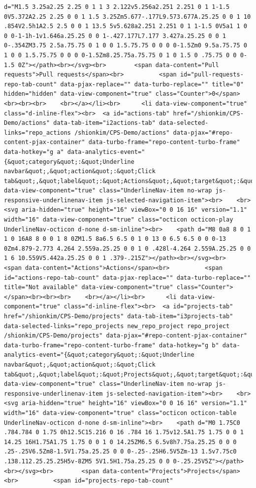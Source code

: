 \documentclass[
  letterpaper,
]{book}
\begin{document}
\begin{verbatim}
d="M1.5 3.25a2.25 2.25 0 1 1 3 2.122v5.256a2.251 2.251 0 1 1-1.5 0V5.372A2.25 2.25 0 0 1 1.5 3.25Zm5.677-.177L9.573.677A.25.25 0 0 1 10 .854V2.5h1A2.5 2.5 0 0 1 13.5 5v5.628a2.251 2.251 0 1 1-1.5 0V5a1 1 0 0 0-1-1h-1v1.646a.25.25 0 0 1-.427.177L7.177 3.427a.25.25 0 0 1 0-.354ZM3.75 2.5a.75.75 0 1 0 0 1.5.75.75 0 0 0 0-1.5Zm0 9.5a.75.75 0 1 0 0 1.5.75.75 0 0 0 0-1.5Zm8.25.75a.75.75 0 1 0 1.5 0 .75.75 0 0 0-1.5 0Z"></path><br></svg><br>        <span data-content="Pull requests">Pull requests</span><br>          <span id="pull-requests-repo-tab-count" data-pjax-replace="" data-turbo-replace="" title="0" hidden="hidden" data-view-component="true" class="Counter">0</span><br><br><br>    <br></a></li><br>      <li data-view-component="true" class="d-inline-flex"><br>  <a id="actions-tab" href="/shionkim/CPS-Demo/actions" data-tab-item="i2actions-tab" data-selected-links="repo_actions /shionkim/CPS-Demo/actions" data-pjax="#repo-content-pjax-container" data-turbo-frame="repo-content-turbo-frame" data-hotkey="g a" data-analytics-event="{&quot;category&quot;:&quot;Underline navbar&quot;,&quot;action&quot;:&quot;Click tab&quot;,&quot;label&quot;:&quot;Actions&quot;,&quot;target&quot;:&quot;UNDERLINE_NAV.TAB&quot;}" data-view-component="true" class="UnderlineNav-item no-wrap js-responsive-underlinenav-item js-selected-navigation-item"><br>    <br>              <svg aria-hidden="true" height="16" viewBox="0 0 16 16" version="1.1" width="16" data-view-component="true" class="octicon octicon-play UnderlineNav-octicon d-none d-sm-inline"><br>    <path d="M8 0a8 8 0 1 1 0 16A8 8 0 0 1 8 0ZM1.5 8a6.5 6.5 0 1 0 13 0 6.5 6.5 0 0 0-13 0Zm4.879-2.773 4.264 2.559a.25.25 0 0 1 0 .428l-4.264 2.559A.25.25 0 0 1 6 10.559V5.442a.25.25 0 0 1 .379-.215Z"></path><br></svg><br>        <span data-content="Actions">Actions</span><br>          <span id="actions-repo-tab-count" data-pjax-replace="" data-turbo-replace="" title="Not available" data-view-component="true" class="Counter"></span><br><br><br>    <br></a></li><br>      <li data-view-component="true" class="d-inline-flex"><br>  <a id="projects-tab" href="/shionkim/CPS-Demo/projects" data-tab-item="i3projects-tab" data-selected-links="repo_projects new_repo_project repo_project /shionkim/CPS-Demo/projects" data-pjax="#repo-content-pjax-container" data-turbo-frame="repo-content-turbo-frame" data-hotkey="g b" data-analytics-event="{&quot;category&quot;:&quot;Underline navbar&quot;,&quot;action&quot;:&quot;Click tab&quot;,&quot;label&quot;:&quot;Projects&quot;,&quot;target&quot;:&quot;UNDERLINE_NAV.TAB&quot;}" data-view-component="true" class="UnderlineNav-item no-wrap js-responsive-underlinenav-item js-selected-navigation-item"><br>    <br>              <svg aria-hidden="true" height="16" viewBox="0 0 16 16" version="1.1" width="16" data-view-component="true" class="octicon octicon-table UnderlineNav-octicon d-none d-sm-inline"><br>    <path d="M0 1.75C0 .784.784 0 1.75 0h12.5C15.216 0 16 .784 16 1.75v12.5A1.75 1.75 0 0 1 14.25 16H1.75A1.75 1.75 0 0 1 0 14.25ZM6.5 6.5v8h7.75a.25.25 0 0 0 .25-.25V6.5Zm8-1.5V1.75a.25.25 0 0 0-.25-.25H6.5V5Zm-13 1.5v7.75c0 .138.112.25.25.25H5v-8ZM5 5V1.5H1.75a.25.25 0 0 0-.25.25V5Z"></path><br></svg><br>        <span data-content="Projects">Projects</span><br>          <span id="projects-repo-tab-count" 
\end{verbatim}
\end{document}
